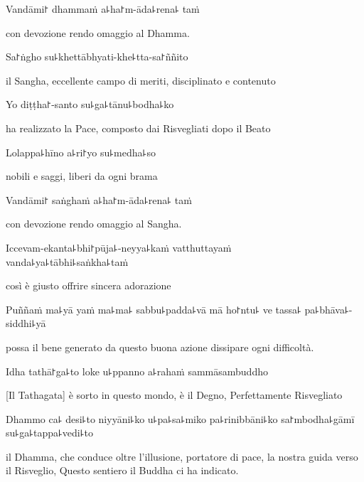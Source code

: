 Vandāmi꜓ dhammaṁ a꜕ha꜓m-āda꜕rena꜕ taṁ

\begin{english}
con devozione rendo omaggio al Dhamma. 
\end{english}

\clearpage

Sa꜓ṅgho su꜕khettābhyati-khe꜕tta-sa꜓ññito

\begin{english}
il Sangha, eccellente campo di meriti, disciplinato e contenuto
\end{english}

Yo diṭṭha꜓-santo su꜕ga꜕tānu꜕bodha꜕ko

\begin{english}
ha realizzato la Pace, composto dai Risvegliati dopo il Beato
\end{english}

Lolappa꜕hīno a꜕ri꜓yo su꜕medha꜕so

\begin{english}
nobili e saggi, liberi da ogni brama
\end{english}

Vandāmi꜓ saṅghaṁ a꜕ha꜓m-āda꜕rena꜕ taṁ

\begin{english}
con devozione rendo omaggio al Sangha.
\end{english}

Iccevam-ekanta꜕bhi꜓pūja꜕-neyya꜕kaṁ vatthuttayaṁ \\vanda꜕ya꜕tābhi꜕saṅkha꜕taṁ

\begin{english}
così è giusto offrire sincera adorazione
\end{english}

Puññaṁ ma꜕yā yaṁ ma꜕ma꜕ sabbu꜕padda꜕vā mā ho꜓ntu꜕ ve tassa꜕ pa꜕bhāva꜕-siddhi꜕yā

\begin{english}
possa il bene generato da questo buona azione dissipare ogni difficoltà.
\end{english}

Idha tathā꜓ga꜕to loke u꜕ppanno a꜕rahaṁ sammāsambuddho

\begin{english}
[Il Tathagata] è sorto in questo mondo, è il Degno, Perfettamente Risvegliato
\end{english}

Dhammo ca꜕ desi꜕to niyyāni꜕ko u꜕pa꜕sa꜕miko pa꜕rinibbāni꜕ko sa꜓mbodha꜕gāmī su꜕ga꜕tappa꜕vedi꜕to

\begin{english}
il Dhamma, che conduce oltre l'illusione, portatore di pace, la nostra guida verso il Risveglio,
Questo sentiero il Buddha ci ha indicato.

\end{english}

